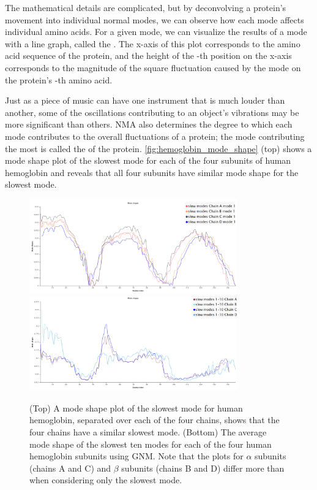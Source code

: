 The mathematical details are complicated, but by deconvolving a protein's movement into individual normal modes, we can observe how each mode affects individual amino acids. For a given mode, we can visualize the results of a mode with a line graph, called the . The x-axis of this plot corresponds to the amino acid sequence of the protein, and the height of the -th position on the x-axis corresponds to the magnitude of the square fluctuation caused by the mode on the protein's -th amino acid.

Just as a piece of music can have one instrument that is much louder than another, some of the oscillations contributing to an object's vibrations may be more significant than others. NMA also determines the degree to which each mode contributes to the overall fluctuations of a protein; the mode contributing the most is called the  of the protein. \autoref{fig:hemoglobin_mode_shape} (top) shows a mode shape plot of the slowest mode for each of the four subunits of human hemoglobin and reveals that all four subunits have similar mode shape for the slowest mode.

\begin{figure}[h]
	\centering
	\mySfFamily
	\includegraphics[width = 0.8\textwidth]{../images/hemoglobin_slowest_mode.png}\\[3ex]
	\includegraphics[width = 0.8\textwidth]{../images/hemoglobin_mode_shape_avg.png}
	\caption{(Top) A mode shape plot of the slowest mode for human hemoglobin, separated over each of the four chains, shows that the four chains have a similar slowest mode. (Bottom) The average mode shape of the slowest ten modes for each of the four human hemoglobin subunits using GNM. Note that the plots for $\alpha$ subunits (chains A and C) and $\beta$ subunits (chains B and D) differ more than when considering only the slowest mode.}
	\label{fig:hemoglobin_mode_shape}
\end{figure}

